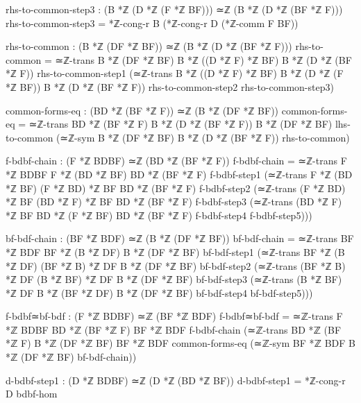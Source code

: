 \documentclass[11pt,a4paper]{book}
\begin{document}
\begin{code}
        rhs-to-common-step3 : (B *ℤ (D *ℤ (F *ℤ BF))) ≃ℤ (B *ℤ (D *ℤ (BF *ℤ F)))
        rhs-to-common-step3 = *ℤ-cong-r B (*ℤ-cong-r D (*ℤ-comm F BF))
        
        rhs-to-common : (B *ℤ (DF *ℤ BF)) ≃ℤ (B *ℤ (D *ℤ (BF *ℤ F)))
        rhs-to-common = ≃ℤ-trans {B *ℤ (DF *ℤ BF)} {B *ℤ ((D *ℤ F) *ℤ BF)} {B *ℤ (D *ℤ (BF *ℤ F))}
                         rhs-to-common-step1
                         (≃ℤ-trans {B *ℤ ((D *ℤ F) *ℤ BF)} {B *ℤ (D *ℤ (F *ℤ BF))} {B *ℤ (D *ℤ (BF *ℤ F))}
                           rhs-to-common-step2 rhs-to-common-step3)

        common-forms-eq : (BD *ℤ (BF *ℤ F)) ≃ℤ (B *ℤ (DF *ℤ BF))
        common-forms-eq = ≃ℤ-trans {BD *ℤ (BF *ℤ F)} {B *ℤ (D *ℤ (BF *ℤ F))} {B *ℤ (DF *ℤ BF)}
                           lhs-to-common (≃ℤ-sym {B *ℤ (DF *ℤ BF)} {B *ℤ (D *ℤ (BF *ℤ F))} rhs-to-common)

        f-bdbf-chain : (F *ℤ BDBF) ≃ℤ (BD *ℤ (BF *ℤ F))
        f-bdbf-chain = ≃ℤ-trans {F *ℤ BDBF} {F *ℤ (BD *ℤ BF)} {BD *ℤ (BF *ℤ F)}
                        f-bdbf-step1
                        (≃ℤ-trans {F *ℤ (BD *ℤ BF)} {(F *ℤ BD) *ℤ BF} {BD *ℤ (BF *ℤ F)}
                          f-bdbf-step2
                          (≃ℤ-trans {(F *ℤ BD) *ℤ BF} {(BD *ℤ F) *ℤ BF} {BD *ℤ (BF *ℤ F)}
                            f-bdbf-step3
                            (≃ℤ-trans {(BD *ℤ F) *ℤ BF} {BD *ℤ (F *ℤ BF)} {BD *ℤ (BF *ℤ F)}
                              f-bdbf-step4 f-bdbf-step5)))

        bf-bdf-chain : (BF *ℤ BDF) ≃ℤ (B *ℤ (DF *ℤ BF))
        bf-bdf-chain = ≃ℤ-trans {BF *ℤ BDF} {BF *ℤ (B *ℤ DF)} {B *ℤ (DF *ℤ BF)}
                        bf-bdf-step1
                        (≃ℤ-trans {BF *ℤ (B *ℤ DF)} {(BF *ℤ B) *ℤ DF} {B *ℤ (DF *ℤ BF)}
                          bf-bdf-step2
                          (≃ℤ-trans {(BF *ℤ B) *ℤ DF} {(B *ℤ BF) *ℤ DF} {B *ℤ (DF *ℤ BF)}
                            bf-bdf-step3
                            (≃ℤ-trans {(B *ℤ BF) *ℤ DF} {B *ℤ (BF *ℤ DF)} {B *ℤ (DF *ℤ BF)}
                              bf-bdf-step4 bf-bdf-step5)))

        f-bdbf≃bf-bdf : (F *ℤ BDBF) ≃ℤ (BF *ℤ BDF)
        f-bdbf≃bf-bdf = ≃ℤ-trans {F *ℤ BDBF} {BD *ℤ (BF *ℤ F)} {BF *ℤ BDF}
                         f-bdbf-chain
                         (≃ℤ-trans {BD *ℤ (BF *ℤ F)} {B *ℤ (DF *ℤ BF)} {BF *ℤ BDF}
                           common-forms-eq
                           (≃ℤ-sym {BF *ℤ BDF} {B *ℤ (DF *ℤ BF)} bf-bdf-chain))

        d-bdbf-step1 : (D *ℤ BDBF) ≃ℤ (D *ℤ (BD *ℤ BF))
        d-bdbf-step1 = *ℤ-cong-r D bdbf-hom
        

\end{code}
\end{document}
